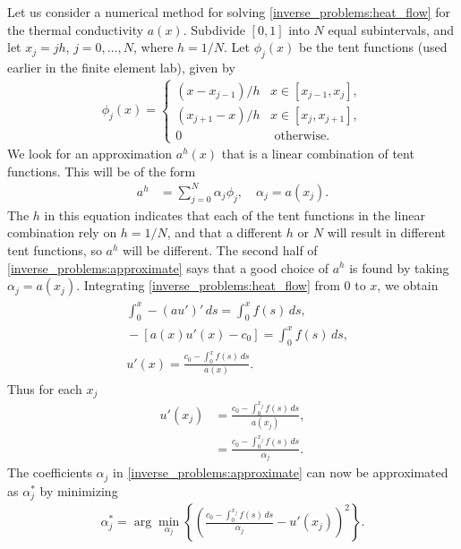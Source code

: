 Let us consider a numerical method for solving \eqref{inverse_problems:heat_flow} for the thermal conductivity $a(x)$.
Subdivide $[0,1]$ into $N$ equal subintervals, and let $x_j = jh$, $j = 0, \ldots,N$, where $h = 1/N$.
Let $\phi_j(x)$ be the tent functions (used earlier in the finite element lab), given by 
\begin{align*}
	\phi_j(x) = \begin{cases}
(x - x_{j-1})/h  &  x \in [x_{j-1},x_j],\\
 (x_{j+1} - x)/h  &  x \in [x_{j},x_{j+1}],\\
0 & \text{ otherwise.}
\end{cases}
\end{align*}
We look for an approximation $a^h(x)$ that is a linear combination of tent functions. This will be of the form 
\begin{align}
	a^h &= \sum_{j=0}^N \alpha_j \phi_j, \quad \alpha_j=a(x_j).
\label{inverse_problems:approximate}
\end{align}
The $h$ in this equation indicates that each of the tent functions in the linear combination rely on $h= 1/N$, and that a different $h$ or $N$ will result in different tent functions, so $a^h$ will be different. 
The second half of \eqref{inverse_problems:approximate} says that a good choice of $a^h$ is found by taking $\alpha_j = a(x_j)$.
Integrating \eqref{inverse_problems:heat_flow} from $0$ to $x$, we obtain
\begin{align}
\begin{split}
&{} \int_0^x -(au')'\, ds = \int_0^x f(s)\, ds,\\
&{} -[a(x)u'(x) - c_0] = \int_0^x f(s)\, ds,\\
&{} u'(x) = \frac{c_0 - \int_0^x f(s)\, ds}{a(x)}.
\end{split}
\end{align}
Thus for each $x_j$
\begin{align*}
	u'(x_j) &= \frac{c_0 - \int_0^{x_j} f(s)\, ds}{a(x_j)},\\
	&= \frac{c_0 - \int_0^{x_j} f(s)\, ds}{\alpha_j}.
\end{align*}
The coefficients $\alpha_j$ in \eqref{inverse_problems:approximate} can now be approximated as $\alpha^*_j$ by minimizing 
\begin{align}
	\alpha^*_j = \arg\min_{\alpha_j}\left\{\left( \frac{c_0 - \int_0^{x_j} f(s)\, ds}{\alpha_j} - u'(x_j)  \right)^2\right\}.
\label{eqn:inverse:min_alpha}
\end{align}


